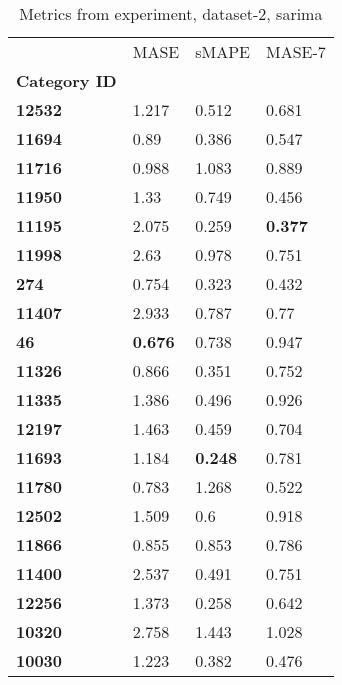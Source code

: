 \begin{table}[H]
\centering
\caption{Metrics from experiment, dataset-2, sarima}
\label{table:sarima-dataset-2}
\begin{tabular}{llll}
\toprule
{} &            MASE &           sMAPE &          MASE-7 \\
\textbf{Category ID} &                 &                 &                 \\
\midrule
\textbf{12532      } &           1.217 &           0.512 &           0.681 \\
\textbf{11694      } &            0.89 &           0.386 &           0.547 \\
\textbf{11716      } &           0.988 &           1.083 &           0.889 \\
\textbf{11950      } &            1.33 &           0.749 &           0.456 \\
\textbf{11195      } &           2.075 &           0.259 &  \textbf{0.377} \\
\textbf{11998      } &            2.63 &           0.978 &           0.751 \\
\textbf{274        } &           0.754 &           0.323 &           0.432 \\
\textbf{11407      } &           2.933 &           0.787 &            0.77 \\
\textbf{46         } &  \textbf{0.676} &           0.738 &           0.947 \\
\textbf{11326      } &           0.866 &           0.351 &           0.752 \\
\textbf{11335      } &           1.386 &           0.496 &           0.926 \\
\textbf{12197      } &           1.463 &           0.459 &           0.704 \\
\textbf{11693      } &           1.184 &  \textbf{0.248} &           0.781 \\
\textbf{11780      } &           0.783 &           1.268 &           0.522 \\
\textbf{12502      } &           1.509 &             0.6 &           0.918 \\
\textbf{11866      } &           0.855 &           0.853 &           0.786 \\
\textbf{11400      } &           2.537 &           0.491 &           0.751 \\
\textbf{12256      } &           1.373 &           0.258 &           0.642 \\
\textbf{10320      } &           2.758 &           1.443 &           1.028 \\
\textbf{10030      } &           1.223 &           0.382 &           0.476 \\
\bottomrule
\end{tabular}
\end{table}

